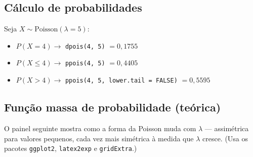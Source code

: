 \documentclass[
  portuguese,
  11pt,
  openany]{book}
\providecommand{\tightlist}{%
  \setlength{\itemsep}{0pt}\setlength{\parskip}{0pt}}
\begin{document}
\subsection{Cálculo de probabilidades}\label{cuxe1lculo-de-probabilidades-3}

Seja \(X \sim \text{Poisson}(\lambda = 5)\):

\begin{itemize}
\tightlist
\item
  \(P(X = 4) \to\) \texttt{dpois(4,\ 5)} \(= 0{,}1755\)
\item
  \(P(X \leq 4) \to\) \texttt{ppois(4,\ 5)} \(= 0{,}4405\)
\item
  \(P(X > 4) \to\) \texttt{ppois(4,\ 5,\ lower.tail\ =\ FALSE)} \(= 0{,}5595\)
\end{itemize}

\subsection{Função massa de probabilidade (teórica)}\label{funuxe7uxe3o-massa-de-probabilidade-teuxf3rica-1}

O painel seguinte mostra como a forma da Poisson muda com \(\lambda\) --- assimétrica para
valores pequenos, cada vez mais simétrica à medida que \(\lambda\) cresce. (Usa os pacotes
\texttt{ggplot2}, \texttt{latex2exp} e \texttt{gridExtra}.)
\end{document}
